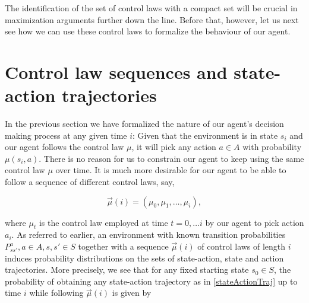 \documentclass[11pt]{article} %
\begin{document}
The identification of the set of control laws with a compact set will be crucial in maximization arguments further down the line. Before that, however, let us next see how we can use these control laws to formalize the behaviour of our agent.

\section{Control law sequences and state-action trajectories}

In the previous section we have formalized the nature of our agent's decision making process at any given time $i$: Given that the environment is in state $s_i$ and our agent follows the control law $\mu$, it will pick any action $a \in A$ with probability $\mu(s_i,a)$. There is no reason for us to constrain our agent to keep using the same control law $\mu$ over time. It is much more desirable for our agent to be able to follow a sequence of different control laws, say,

\begin{equation}\label{controlLawSeqence}
	\vec{\mu}(i) = (\mu_0, \mu_1, \dots, \mu_i),
\end{equation}

where $\mu_t$ is the control law employed at time $t = 0,\dots i$ by our agent to pick action $a_i$. As referred to earlier, an environment with known transition probabilities $P^a_{ss'}, a \in A, s,s' \in S$ together with a sequence $\vec{\mu}(i)$ of control laws of length $i$ induces probability distributions on the sets of state-action, state and action trajectories. More precisely, we see that for any fixed starting state $s_0 \in S$, the probability of obtaining any state-action trajectory as in \ref{stateActionTraj} up to time $i$ while following $\vec{\mu}(i)$ is given by
\end{document}
